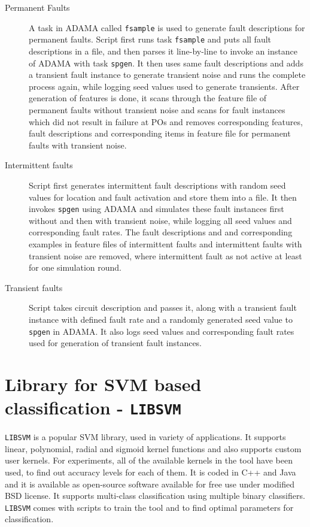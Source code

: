 \begin{description}
  \item[Permanent Faults] A task in ADAMA called \texttt{fsample} is used to generate fault descriptions for permanent faults. Script first runs task \texttt{fsample} and puts all fault descriptions in a file, and then parses it line-by-line to invoke an instance of ADAMA with task \texttt{spgen}. It then uses same fault descriptions and adds a transient fault instance to generate transient noise and runs the complete process again, while logging seed values used to generate transients. After generation of features is done, it scans through the feature file of permanent faults without transient noise and scans for fault instances which did not result in failure at POs and removes corresponding features, fault descriptions and corresponding items in feature file for permanent faults with transient noise.

  \item[Intermittent faults] Script first generates intermittent fault descriptions with random seed values for location and fault activation and store them into a file. It then invokes \texttt{spgen} using ADAMA and simulates these fault instances first without and then with transient noise, while logging all seed values and corresponding fault rates. The fault descriptions and and corresponding examples in feature files of intermittent faults and intermittent faults with transient noise are removed, where intermittent fault as not active at least for one simulation round.

  \item[Transient faults] Script takes circuit description and passes it, along with a transient fault instance with defined fault rate and a randomly generated seed value to \texttt{spgen} in ADAMA. It also logs seed values and corresponding fault rates used for generation of transient fault instances.
\end{description}

\section{Library for SVM based classification - \texttt{LIBSVM}}
\label{sec:libsvm}
\texttt{LIBSVM} \cite{Chang2011} is a popular SVM library, used in variety of applications. It supports linear, polynomial, radial and sigmoid kernel functions and also supports custom user kernels. For experiments, all of the available kernels in the tool have been used, to find out accuracy levels for each of them. It is coded in C++ and Java and it is available as open-source software available for free use under modified BSD license. It supports multi-class classification using multiple binary classifiers. \texttt{LIBSVM} comes with scripts to train the tool and to find optimal parameters for classification.

